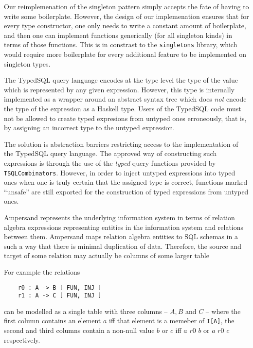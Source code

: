 \begin{description}[leftmargin=1em]
  Our reimplemenation of the singleton pattern simply accepts the fate of 
  having to write some boilerplate. However, the design of our implemenation 
  ensures that for every type constructor, one only needs to write a constant 
  amount of boilerplate, and then one can implement functions generically (for 
  all singleton kinds) in terms of those functions. This is in constrast 
  to the \texttt{singletons} library, which would require more boilerplate 
  for every additional feature to be implemented on singleton types. 

\item[Defining a typed term language from an untyped one]
  The TypedSQL query language encodes at the type level the type of the 
  value which is represented by any given expression. However, this
  type is internally implemented as a wrapper around an abstract syntax
  tree which does \emph{not} encode the type of the expression as a Haskell
  type. Users of the TypedSQL code must not be allowed to create typed
  expresions from untyped ones erroneously, that is, by assigning an incorrect
  type to the untyped expression. 
  
  The solution is abstraction barriers restricting access to the implementation of
  the TypedSQL query language. The approved way of constructing such expressions
  is through the use of the \emph{typed} query functions provided by
  \texttt{TSQLCombinators}. However, in order to inject untyped expressions
  into typed ones when one is truly certain that the assigned type is correct,
  functions marked ``unsafe'' are still exported for the construction of 
  typed expressions from untyped ones. 

\item[Relationship between SQL schemata and relation algebra]
  Ampersand represents the underlying information system in terms of relation algebra
  expressions representing entities in the information system and relations between them.
  Ampersand maps relation algebra entities to SQL schemas in a such a way that 
  there is minimal duplication of data. Therefore, the source and target of some 
  relation may actually be columns of some larger table 

  For example the relations 
  \begin{verbatim} 
    r0 : A -> B [ FUN, INJ ] 
    r1 : A -> C [ FUN, INJ ]  
  \end{verbatim}
  \vspace{-2em}
  can be modelled as a single table with three columns -- $A, B$ and $C$ --
  where the first column contains an element $a$ iff that element is a memeber
  of \texttt{I[A]}, the second and third columns contain a non-null value $b$ or
  $c$ iff $a\,\,r0\,\,b$ or $a\,\,r0\,\,c$ respectively. 


\end{description}
